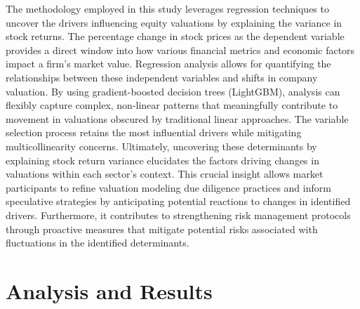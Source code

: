 \documentclass[12pt,a4paper,english]{article}
\begin{document}
The methodology employed in this study leverages regression techniques to uncover the drivers influencing equity valuations by explaining the variance in stock returns. The percentage change in stock prices as the dependent variable provides a direct window into how various financial metrics and economic factors impact a firm's market value. Regression analysis allows for quantifying the relationships between these independent variables and shifts in company valuation. By using gradient-boosted decision trees (LightGBM), analysis can flexibly capture complex, non-linear patterns that meaningfully contribute to movement in valuations obscured by traditional linear approaches. The variable selection process retains the most influential drivers while mitigating multicollinearity concerns. Ultimately, uncovering these determinants by explaining stock return variance elucidates the factors driving changes in valuations within each sector's context. This crucial insight allows market participants to refine valuation modeling due diligence practices and inform speculative strategies by anticipating potential reactions to changes in identified drivers. Furthermore, it contributes to strengthening risk management protocols through proactive measures that mitigate potential risks associated with fluctuations in the identified determinants.

\section{Analysis and Results}
\end{document}
